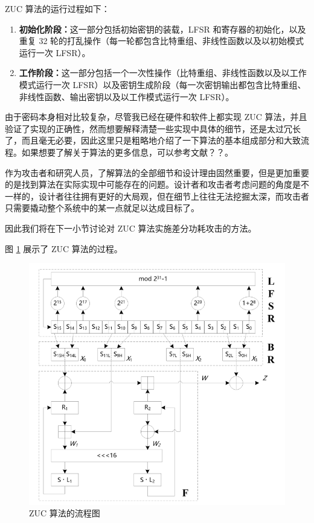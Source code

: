 \vspace*{\baselineskip}

ZUC 算法的运行过程如下：

\begin{enumerate}
    \item \textbf{初始化阶段：}这一部分包括初始密钥的装载，LFSR 和寄存器的初始化，以及重复 32 轮的打乱操作（每一轮都包含比特重组、非线性函数以及以初始模式运行一次 LFSR）。
    \item \textbf{工作阶段：}这一部分包括一个一次性操作（比特重组、非线性函数以及以工作模式运行一次 LFSR）以及密钥生成阶段（每一次密钥输出都包含比特重组、非线性函数、输出密钥以及以工作模式运行一次 LFSR）。
\end{enumerate}

\vspace*{\baselineskip}

由于密码本身相对比较复杂，尽管我已经在硬件和软件上都实现 ZUC 算法，并且验证了实现的正确性，然而想要解释清楚一些实现中具体的细节，还是太过冗长了，而且毫无必要，因此这里只是粗略地介绍了一下算法的基本组成部分和大致流程。如果想要了解关于算法的更多信息，可以参考文献？？。

作为攻击者和研究人员，了解算法的全部细节和设计理由固然重要，但是更加重要的是找到算法在实际实现中可能存在的问题。设计者和攻击者考虑问题的角度是不一样的，设计者往往拥有更好的大局观，但在细节上往往无法挖掘太深，而攻击者只需要撬动整个系统中的某一点就足以达成目标了。

因此我们将在下一小节讨论对 ZUC 算法实施差分功耗攻击的方法。

\vspace*{\baselineskip}

图 \ref{fig:zuc_algo} 展示了 ZUC 算法的过程。

\begin{figure}[htbp]
    \centering
    \includegraphics[height=.5\textheight]{../images/zuc_algo.png}
    \caption{ZUC 算法的流程图}
    \label{fig:zuc_algo}
\end{figure}


